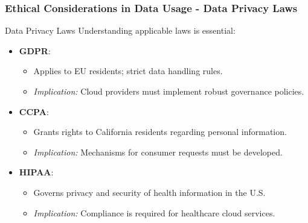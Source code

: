 \documentclass[aspectratio=169]{beamer}
\begin{document}
\begin{frame}[fragile]
    \frametitle{Ethical Considerations in Data Usage - Data Privacy Laws}
    \begin{block}{Data Privacy Laws}
        Understanding applicable laws is essential:
        \begin{itemize}
            \item \textbf{GDPR}:
                \begin{itemize}
                    \item Applies to EU residents; strict data handling rules.
                    \item \textit{Implication:} Cloud providers must implement robust governance policies.
                \end{itemize}
            \item \textbf{CCPA}:
                \begin{itemize}
                    \item Grants rights to California residents regarding personal information.
                    \item \textit{Implication:} Mechanisms for consumer requests must be developed.
                \end{itemize}
            \item \textbf{HIPAA}:
                \begin{itemize}
                    \item Governs privacy and security of health information in the U.S.
                    \item \textit{Implication:} Compliance is required for healthcare cloud services.
                \end{itemize}
        \end{itemize}
    \end{block}
\end{frame}
\end{document}
